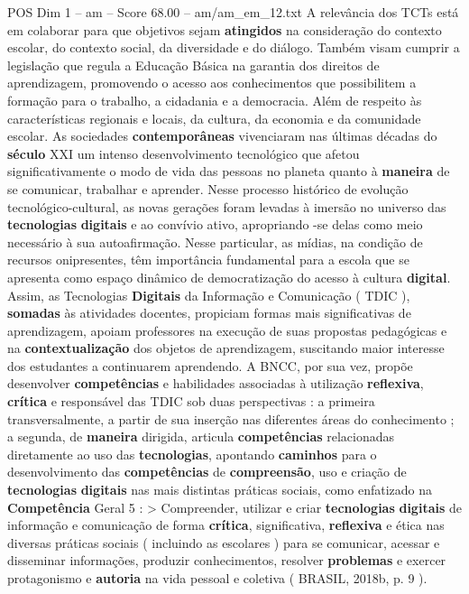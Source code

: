 \begin{textsample}{POS Dim 1 – am – Score 68.00 – am/am\_em\_12.txt}
A relevância dos TCTs está em colaborar para que objetivos sejam \textbf{atingidos} na consideração do contexto escolar, do contexto social, da diversidade e do diálogo.
Também visam cumprir a legislação que regula a Educação Básica na garantia dos direitos de aprendizagem, promovendo o acesso aos conhecimentos que possibilitem a formação para o trabalho, a cidadania e a democracia.
Além de respeito às características regionais e locais, da cultura, da economia e da comunidade escolar.
As sociedades \textbf{contemporâneas} vivenciaram nas últimas décadas do \textbf{século} XXI um intenso desenvolvimento tecnológico que afetou significativamente o modo de vida das pessoas no planeta quanto à \textbf{maneira} de se comunicar, trabalhar e aprender.
Nesse processo histórico de evolução tecnológico-cultural, as novas gerações foram levadas à imersão no universo das \textbf{tecnologias} \textbf{digitais} e ao convívio ativo, apropriando -se delas como meio necessário à sua autoafirmação.
Nesse particular, as mídias, na condição de recursos onipresentes, têm importância fundamental para a escola que se apresenta como espaço dinâmico de democratização do acesso à cultura \textbf{digital}.
Assim, as Tecnologias \textbf{Digitais} da Informação e Comunicação ( TDIC ), \textbf{somadas} às atividades docentes, propiciam formas mais significativas de aprendizagem, apoiam professores na execução de suas propostas pedagógicas e na \textbf{contextualização} dos objetos de aprendizagem, suscitando maior interesse dos estudantes a continuarem aprendendo.
A BNCC, por sua vez, propõe desenvolver \textbf{competências} e habilidades associadas à utilização \textbf{reflexiva}, \textbf{crítica} e responsável das TDIC sob duas perspectivas : a primeira transversalmente, a partir de sua inserção nas diferentes áreas do conhecimento ; a segunda, de \textbf{maneira} dirigida, articula \textbf{competências} relacionadas diretamente ao uso das \textbf{tecnologias}, apontando \textbf{caminhos} para o desenvolvimento das \textbf{competências} de \textbf{compreensão}, uso e criação de \textbf{tecnologias} \textbf{digitais} nas mais distintas práticas sociais, como enfatizado na \textbf{Competência} Geral 5 : > Compreender, utilizar e criar \textbf{tecnologias} \textbf{digitais} de informação e comunicação de forma \textbf{crítica}, significativa, \textbf{reflexiva} e ética nas diversas práticas sociais ( incluindo as escolares ) para se comunicar, acessar e disseminar informações, produzir conhecimentos, resolver \textbf{problemas} e exercer protagonismo e \textbf{autoria} na vida pessoal e coletiva ( BRASIL, 2018b, p. 9 ).

\end{textsample}
